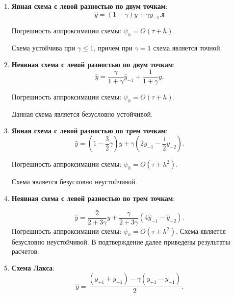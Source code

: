 \documentclass[12pt, a4paper]{article}
\begin{document}
\begin{enumerate}

	\item \textbf{Явная схема с левой разностью по двум точкам}:
	\begin{equation*}
		\widehat{y} = (1 - \gamma) y + \gamma y_{-1}.
		\label{s1}
я	\end{equation*}
	
	Погрешность аппроксимации схемы: 
	$\psi_h = O(\tau + h)$.
	
	Схема устойчива при $\gamma \leq 1 $, причем при $\gamma = 1$ схема является точной.
	
	\bigskip
	\item \textbf{Неявная схема с левой разностью по двум точкам}:
	\begin{equation*}
		\widehat{y} = \dfrac{\gamma}{1 + \gamma} \widehat{y}_{-1} + \dfrac{1}{1 + \gamma} y .
		\label{s2}
	\end{equation*}
	
	Погрешность аппроксимации схемы: $\psi_h = O(\tau + h)$.
	
	Данная схема является безусловно устойчивой.
	
	\bigskip
	\item \textbf{Явная схема с левой разностью по трем точкам}:
	\begin{equation*}
		\widehat{y} = (1 - \frac{3}{2}\gamma) y + \gamma(2y_{-1} - \frac{1}{2}y_{-2}).
		\label{s3}
	\end{equation*}
	
	Погрешность аппроксимации схемы: 
	$\psi_h = O(\tau + h^2)$.
	
	Схема является безусловно неустойчивой.
	
	\bigskip
	\item \textbf{Неявная схема с левой разностью по трем точкам}:
	
	\begin{equation*}
		\widehat{y} = \frac{2}{2 + 3 \gamma} y +\frac{\gamma}{2 + 3 \gamma}( 4 \widehat{y}_{-1} -  \widehat{y}_{-2}).
		\label{s4}
	\end{equation*}
	Погрешность аппроксимации схемы: $\psi_h = O(\tau + h^2)$.
	Схема является безусловно неустойчивой. В подтверждение далее приведены результаты расчетов.
	
	\item \textbf{Схема Лакса}:
	\bigskip
	\begin{equation*}
		\widehat{y} = \dfrac{(y_{+1} + y_{-1}) - \gamma(y_{+1} - y_{-1})}{2} .
		\label{s5}
	\end{equation*}
	

\end{enumerate}
\end{document}
